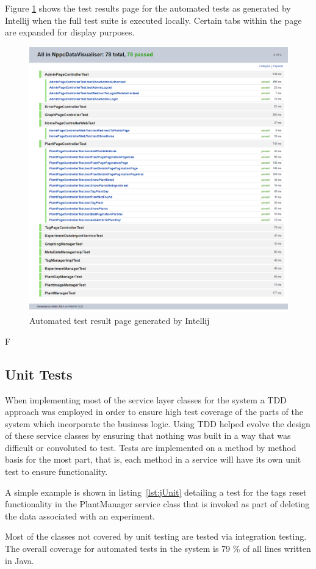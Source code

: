 Figure \ref{fig:testrel} shows the test results page for the automated tests as generated by Intellij when the full test suite is executed locally. Certain tabs within the page are expanded for display purposes.

\begin{figure}[H]
    \centering
    \includegraphics[width=\textwidth]{images/testing/results}
    \caption{Automated test result page generated by Intellij }
    \label{fig:testrel}
\end{figure} F

\subsection{Unit Tests}

 When implementing most of the service layer classes for the system a TDD approach was employed in order to ensure high test coverage of the parts of the system which incorporate the business logic. Using TDD helped evolve the design of these service classes by ensuring that nothing was built in a way that was difficult or convoluted to test. Tests are implemented on a method by method basis for the most part, that is, each method in a service will have its own unit test to ensure functionality.
 
  A simple example is shown in listing~\ref{lst:jUnit} detailing a test for the tags reset functionality in the PlantManager service class that is invoked as part of deleting the data associated with an experiment.
\lstjava

Most of the classes not covered by unit testing are tested via integration testing. The overall coverage for automated tests in the system is 79 \% of all lines written in Java.

